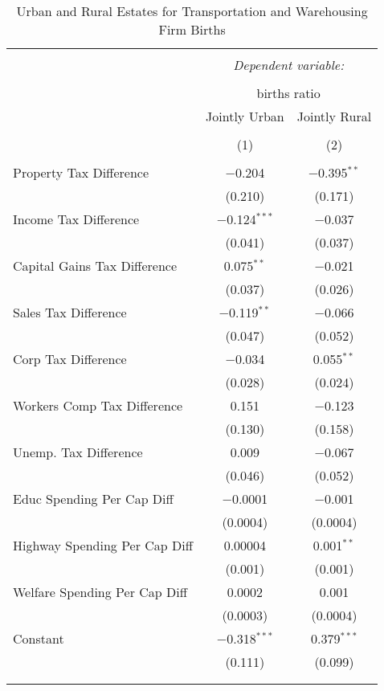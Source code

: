
\begin{table}[!htbp] \centering 
  \caption{Urban and Rural Estates for  Transportation and Warehousing Firm Births} 
  \label{} 
\begin{tabular}{@{\extracolsep{5pt}}lcc} 
\\[-1.8ex]\hline 
\hline \\[-1.8ex] 
 & \multicolumn{2}{c}{\textit{Dependent variable:}} \\ 
\cline{2-3} 
\\[-1.8ex] & \multicolumn{2}{c}{births ratio} \\ 
 & Jointly Urban & Jointly Rural \\ 
\\[-1.8ex] & (1) & (2)\\ 
\hline \\[-1.8ex] 
 Property Tax Difference & $-$0.204 & $-$0.395$^{**}$ \\ 
  & (0.210) & (0.171) \\ 
  Income Tax Difference & $-$0.124$^{***}$ & $-$0.037 \\ 
  & (0.041) & (0.037) \\ 
  Capital Gains Tax Difference & 0.075$^{**}$ & $-$0.021 \\ 
  & (0.037) & (0.026) \\ 
  Sales Tax Difference & $-$0.119$^{**}$ & $-$0.066 \\ 
  & (0.047) & (0.052) \\ 
  Corp Tax Difference & $-$0.034 & 0.055$^{**}$ \\ 
  & (0.028) & (0.024) \\ 
  Workers Comp Tax Difference & 0.151 & $-$0.123 \\ 
  & (0.130) & (0.158) \\ 
  Unemp. Tax Difference & 0.009 & $-$0.067 \\ 
  & (0.046) & (0.052) \\ 
  Educ Spending Per Cap Diff & $-$0.0001 & $-$0.001 \\ 
  & (0.0004) & (0.0004) \\ 
  Highway Spending Per Cap Diff & 0.00004 & 0.001$^{**}$ \\ 
  & (0.001) & (0.001) \\ 
  Welfare Spending Per Cap Diff & 0.0002 & 0.001 \\ 
  & (0.0003) & (0.0004) \\ 
  Constant & $-$0.318$^{***}$ & 0.379$^{***}$ \\ 
  & (0.111) & (0.099) \\ 
 \hline \\[-1.8ex] 
\hline 
\hline \\[-1.8ex] 
\end{tabular} 
\end{table} 

